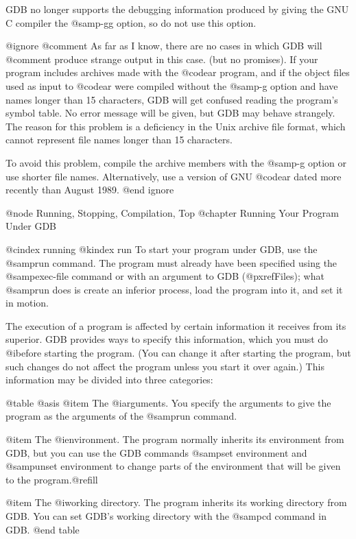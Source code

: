 GDB no longer supports the debugging information produced by giving the
GNU C compiler the @samp{-gg} option, so do not use this option.

@ignore
@comment As far as I know, there are no cases in which GDB will
@comment produce strange output in this case.  (but no promises).
If your program includes archives made with the @code{ar} program, and
if the object files used as input to @code{ar} were compiled without the
@samp{-g} option and have names longer than 15 characters, GDB will get
confused reading the program's symbol table.  No error message will be
given, but GDB may behave strangely.  The reason for this problem is a
deficiency in the Unix archive file format, which cannot represent file
names longer than 15 characters.

To avoid this problem, compile the archive members with the @samp{-g}
option or use shorter file names.  Alternatively, use a version of GNU
@code{ar} dated more recently than August 1989.
@end ignore

@node Running, Stopping, Compilation, Top
@chapter Running Your Program Under GDB

@cindex running
@kindex run
To start your program under GDB, use the @samp{run} command.  The program
must already have been specified using the @samp{exec-file} command or with
an argument to GDB (@pxref{Files}); what @samp{run} does is create an
inferior process, load the program into it, and set it in motion.

The execution of a program is affected by certain information it
receives from its superior.  GDB provides ways to specify this
information, which you must do @i{before} starting the program.  (You
can change it after starting the program, but such changes do not affect
the program unless you start it over again.)  This information may be
divided into three categories:

@table @asis
@item The @i{arguments.}
You specify the arguments to give the program as the arguments of the
@samp{run} command.  

@item The @i{environment.}
The program normally inherits its environment from GDB, but you can
use the GDB commands @samp{set environment} and
@samp{unset environment} to change parts of the environment that will
be given to the program.@refill

@item The @i{working directory.}
The program inherits its working directory from GDB.  You can set GDB's
working directory with the @samp{cd} command in GDB.
@end table

